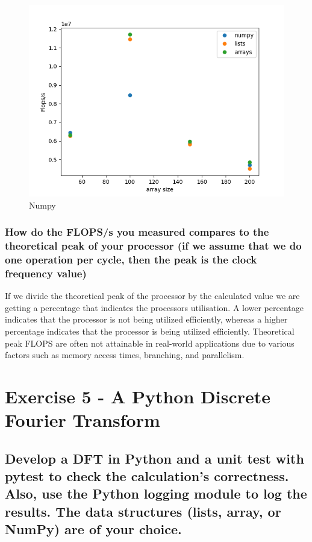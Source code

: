 \documentclass{article}
\begin{document}
\begin{figure}[h]
    \centering
    \includegraphics[width=\textwidth]{Exercise4_plot.png}
    \caption{Numpy}
    \label{fig:numpy}
\end{figure}

\subsubsection{How do the FLOPS/s you measured compares to the theoretical peak of your processor (if we assume that we do one operation per cycle, then the peak is the clock frequency value)}

If we divide the theoretical peak of the processor by the calculated value we are getting a percentage that indicates the processors utilisation.
A lower percentage indicates that the processor is not being utilized efficiently, whereas a higher percentage indicates that the processor is being utilized efficiently.
Theoretical peak FLOPS are often not attainable in real-world applications due to various factors such as memory access times, branching, and parallelism. 



\section{Exercise 5 - A Python Discrete Fourier Transform}

\subsection{Develop a DFT in Python and a unit test with pytest to check the calculation's correctness. Also, use the Python logging module to log the results. The data structures (lists, array, or NumPy) are of your choice.}
\end{document}

